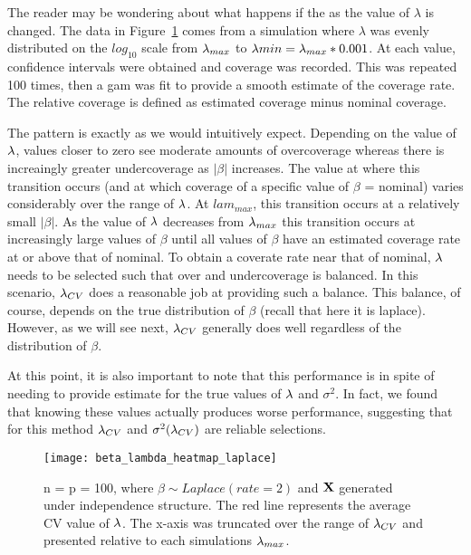 The reader may be wondering about what happens if the as the value of $\lambda$ is changed. The data in Figure~\ref{Fig:beta_lambda_heatmap_laplace} comes from a simulation where $\lambda$ was evenly distributed on the $log_{10}$ scale from $\lambda_{max}$ to $\lambda{min} = \lambda_{max} * 0.001$. At each value, confidence intervals were obtained and coverage was recorded. This was repeated 100 times, then a gam was fit to provide a smooth estimate of the coverage rate. The relative coverage is defined as estimated coverage minus nominal coverage.

The pattern is exactly as we would intuitively expect. Depending on the value of $\lambda$, values closer to zero see moderate amounts of overcoverage whereas there is increaingly greater undercoverage as $|\beta|$ increases. The value at where this transition occurs (and at which coverage of a specific value of $\beta$ = nominal) varies considerably over the range of $\lambda$. At $lam_{max}$, this transition occurs at a relatively small $|\beta|$. As the value of $\lambda$ decreases from $\lambda_{max}$ this transition occurs at increasingly large values of $\beta$ until all values of $\beta$ have an estimated coverage rate at or above that of nominal. To obtain a coverate rate near that of nominal, $\lambda$ needs to be selected such that over and undercoverage is balanced. In this scenario, $\lambda_{CV}$ does a reasonable job at providing such a balance. This balance, of course, depends on the true distribution of $\beta$ (recall that here it is laplace). However, as we will see next, $\lambda_{CV}$ generally does well regardless of the distribution of $\beta$.

At this point, it is also important to note that this performance is in spite of needing to provide estimate for the true values of $\lambda$ and $\sigma^2$. In fact, we found that knowing these values actually produces worse performance, suggesting that for this method $\lambda_{CV}$ and $\sigma^2(\lambda_{CV})$ are reliable selections.


\begin{figure}
  \texttt{[image: beta\_lambda\_heatmap\_laplace]}
  \caption{\label{Fig:beta_lambda_heatmap_laplace} n = p = 100, where $\beta \sim Laplace(rate = 2)$ and $\mathbf{X}$ generated under independence structure. The red line represents the average CV value of $\lambda$. The x-axis was truncated over the range of $\lambda_{CV}$ and presented relative to each simulations $\lambda_{max}$.}
\end{figure}

